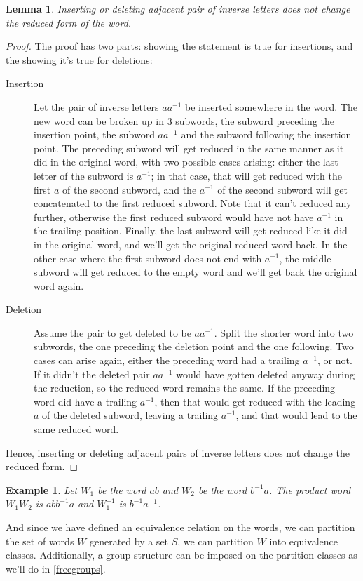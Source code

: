 \documentclass[12pt]{article}
\newtheorem{lem}[thm]{Lemma}
\newtheorem{exmp}[thm]{Example}
\theoremstyle{definition}
\begin{document}
\begin{lem}
Inserting or deleting adjacent pair of inverse letters does not change the reduced form of the word.
\end{lem}

\begin{proof}
The proof has two parts: showing the statement is true for insertions, and the showing it's true for deletions:
\begin{description}
\item[Insertion] Let the pair of inverse letters $aa^{-1}$ be inserted somewhere in the word. The new word can be broken up in 3 subwords, the subword preceding the insertion point, the subword $aa^{-1}$ and the subword following the insertion point. The preceding subword will get reduced in the same manner as it did in the original word, with two possible cases arising: either the last letter of the subword is $a^{-1}$; in that case, that will get reduced with the first $a$ of the second subword, and the $a^{-1}$ of the second subword will get concatenated to the first reduced subword. Note that it can't reduced any further, otherwise the first reduced subword would have not have $a^{-1}$ in the trailing position. Finally, the last subword will get reduced like it did in the original word, and we'll get the original reduced word back. In the other case where the first subword does not end with $a^{-1}$, the middle subword will get reduced to the empty word and we'll get back the original word again.
\item[Deletion] Assume the pair to get deleted to be $aa^{-1}$. Split the shorter word into two subwords, the one preceding the deletion point and the one following. Two cases can arise again, either the preceding word had a trailing $a^{-1}$, or not. If it didn't the deleted pair $aa^{-1}$ would have gotten deleted anyway during the reduction, so the reduced word remains the same. If the preceding word did have a trailing $a^{-1}$, then that would get reduced with the leading $a$ of the deleted subword, leaving a trailing $a^{-1}$, and that would lead to the same reduced word. 
\end{description}
Hence, inserting or deleting adjacent pairs of inverse letters does not change the reduced form.
\end{proof}

\begin{exmp}
Let $W_1$ be the word $ab$ and $W_2$ be the word $b^{-1}a$. The product word $W_1W_2$ is $abb^{-1}a$ and $W_1^{-1}$ is $b^{-1}a^{-1}$.
\end{exmp}
And since we have defined an equivalence relation on the words, we can partition the set of words $W$ generated by a set $S$, we can partition $W$ into equivalence classes. Additionally, a group structure can be imposed on the partition classes as we'll do in \autoref{freegroups}.
\end{document}

